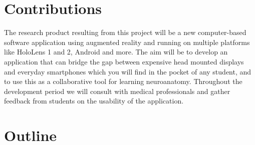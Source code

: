 
\section{Contributions}

The research product resulting from this project will be a new computer-based software application using augmented reality and running on multiple platforms like HoloLens 1 and 2, Android and more. The aim will be to develop an application that can bridge the gap between expensive head mounted displays and everyday smartphones which you will find in the pocket of any student, and to use this as a collaborative tool for learning neuroanatomy. Throughout the development period we will consult with medical professionals and gather feedback from students on the usability of the application.


\section{Outline}


